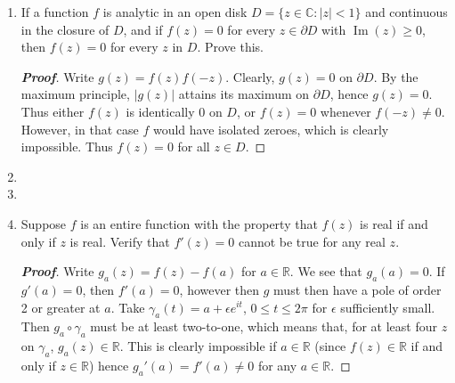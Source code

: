 \documentclass[12pt,leqno]{article}
\theoremstyle{definition}
\newcommand{\im}{\operatorname{Im}}
\newcommand{\R}{\mathbb{R}}
\newcommand{\C}{\mathbb{C}}
\newenvironment{Proof}{\begin{proof}[\textnormal{\textbf{Proof}}]}{\end{proof}}
\newenvironment{Solution}{\begin{proof}[\textnormal{\textbf{Solution}}]}{\end{proof}}
\begin{document}
\begin{enumerate}
\begin{Solution}
  \end{Solution}
 \item If a function $f$ is analytic in an open disk $D=\{z\in\C:|z|<1\}$ and continuous in the closure of $D$, and if $f(z)=0$ for every $z\in\partial D$ with $\im(z)\geq0$, then $f(z)=0$ for every $z$ in $D$. Prove this.
  \begin{Proof}
   Write $g(z)=f(z)f(-z)$. Clearly, $g(z)=0$ on $\partial D$. By the maximum principle, $|g(z)|$ attains its maximum on $\partial D$, hence $g(z)=0$. Thus either $f(z)$ is identically 0 on $D$, or $f(z)=0$ whenever $f(-z)\not=0$. However, in that case $f$ would have isolated zeroes, which is clearly impossible. Thus $f(z)=0$ for all $z\in D$.
  \end{Proof}
 \item 
 \item 
 \item Suppose $f$ is an entire function with the property that $f(z)$ is real if and only if $z$ is real. Verify that $f'(z)=0$ cannot be true for any real $z$.
  \begin{Proof}
   Write $g_a(z)=f(z)-f(a)$ for $a\in\R$. We see that $g_a(a)=0$. If $g'(a)=0$, then $f'(a)=0$, however then $g$ must then have a pole of order 2 or greater at $a$. Take $\gamma_a(t)=a+\epsilon e^{it}$, $0\leq t\leq2\pi$ for $\epsilon$ sufficiently small. Then $g_a\circ\gamma_a$ must be at least two-to-one, which means that, for at least four $z$ on $\gamma_a$, $g_a(z)\in\R$. This is clearly impossible if $a\in\R$ (since $f(z)\in\R$ if and only if $z\in\R$) hence $g_a'(a)=f'(a)\not=0$ for any $a\in\R$.
  \end{Proof}
\end{enumerate}
\end{document}
